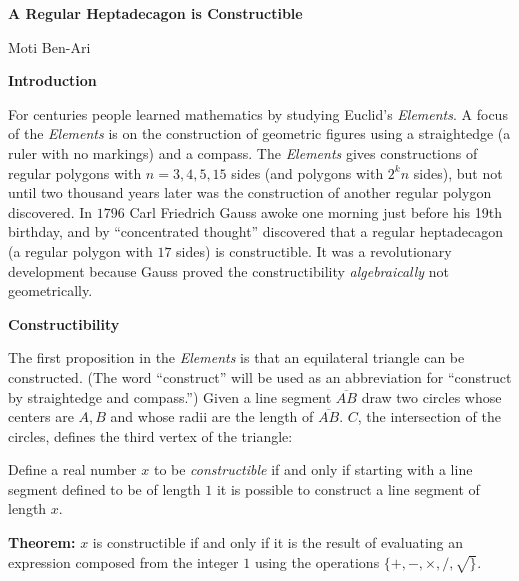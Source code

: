 \documentclass[a4paper,11pt]{article}
\newcommand*{\vertex}[1]
  {\fill[shift only] (#1) circle (1.5pt)}
\begin{document}
\begin{center}
\bfseries\Large
A Regular Heptadecagon is Constructible

\medskip

Moti Ben-Ari
\end{center}

\textbf{Introduction}

For centuries people learned mathematics by studying Euclid's \textit{Elements}. A focus of the \textit{Elements} is on the construction of geometric figures using a straightedge (a ruler with no markings) and a compass. The \textit{Elements} gives constructions of regular polygons with $n=3,4,5,15$ sides (and polygons with $2^kn$ sides), but not until two thousand years later was the construction of another regular polygon discovered. In $1796$ Carl Friedrich Gauss awoke one morning just before his 19th birthday, and by ``concentrated thought'' discovered that a regular heptadecagon (a regular polygon with $17$ sides) is constructible. It was a  revolutionary development because Gauss proved the constructibility \emph{algebraically} not geometrically.

\textbf{Constructibility}

The first proposition in the \textit{Elements} is that an equilateral triangle can be constructed. (The word ``construct'' will be used as an abbreviation for ``construct by straightedge and compass.'') Given a line segment $\overline{AB}$ draw two circles whose centers are $A,B$ and whose radii are the length of $\overline{AB}$. $C$, the intersection of the circles, defines the third vertex of the triangle:
\begin{center}
\end{center}

Define a real number $x$ to be \textit{constructible} if and only if starting with a line segment defined to be of length $1$ it is possible to construct a line segment of length $x$.

\textbf{Theorem:} $x$ is constructible if and only if it is the result of evaluating an expression composed from the integer $1$ using the operations $\{+,-,\times,/,\surd\}$.
\end{document}
